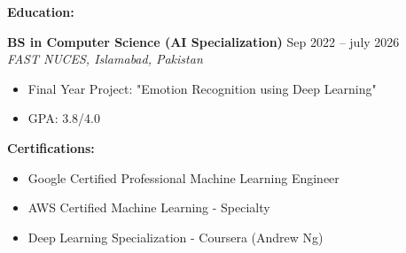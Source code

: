 \documentclass[a4paper,12pt]{article}
\begin{document}
\textbf{Education:}


\textbf{BS in Computer Science (AI Specialization)} \hfill Sep 2022 -- july 2026 \\
\textit{FAST NUCES, Islamabad, Pakistan}
\begin{itemize}[leftmargin=*]
    \item Final Year Project: "Emotion Recognition using Deep Learning"
    \item GPA: 3.8/4.0
\end{itemize}

\textbf{Certifications:}
\begin{itemize}[leftmargin=*]
    \item Google Certified Professional Machine Learning Engineer
    \item AWS Certified Machine Learning - Specialty
    \item Deep Learning Specialization - Coursera (Andrew Ng)
\end{itemize}
\end{document}
